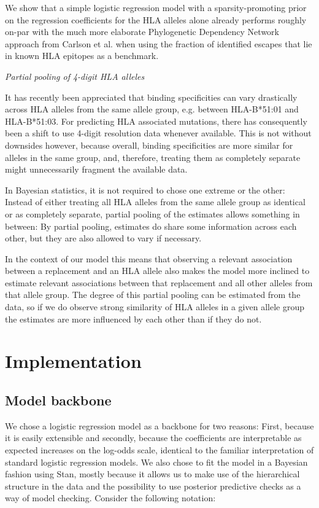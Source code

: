 \documentclass[fleqn,11pt]{SelfArx} %
\begin{document}
  We show that a simple logistic regression model with a sparsity-promoting prior on the regression coefficients for the HLA alleles alone already performs roughly on-par  with the much more elaborate Phylogenetic Dependency Network approach from Carlson et al. when using the fraction of identified escapes that lie in known HLA epitopes as a benchmark.

  \textit{Partial pooling of 4-digit HLA alleles}
  
  It has recently been appreciated that binding specificities can vary drastically across  HLA alleles from the same allele group, e.g. between HLA-B*51:01 and HLA-B*51:03. For predicting HLA associated mutations, there has consequently been a shift to use 4-digit resolution data whenever available. This is not without downsides however, because overall, binding specificities are more similar for alleles in the same group, and, therefore, treating them as completely separate might unnecessarily fragment the available data.

  In Bayesian statistics, it is not required to chose one extreme or the other: Instead of either treating all HLA alleles from the same allele group as identical or as completely separate, partial pooling of the estimates allows something in between: By partial pooling, estimates do share some information across each other, but they are also allowed to vary if necessary.

  In the context of our model this means that observing a relevant association between a replacement and an HLA allele also makes the model more inclined to estimate relevant associations between that replacement and all other alleles from that allele group. The degree of this partial pooling can be estimated from the data, so if we do observe strong similarity of HLA alleles in a given allele group the estimates are more influenced by each other than if they do not.

\section{Implementation}

\subsection*{Model backbone}

We chose a logistic regression model as a backbone for two reasons: First, because it is easily extensible and secondly, because the coefficients are interpretable as expected increases on the log-odds scale, identical to the familiar interpretation of standard logistic regression models.
We also chose to fit the model in a Bayesian fashion using Stan, mostly because it allows us to make use of the hierarchical structure in the data and the possibility to use posterior predictive checks as a way of model checking.
Consider the following notation:
\end{document}
